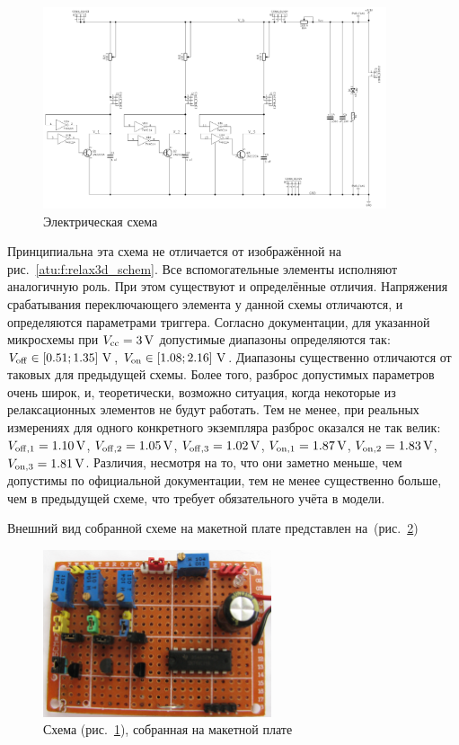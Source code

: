 \begin{figure}[htb!]
  \centerline{\includegraphics[width=0.9\textwidth]{p/relax3ds_schem.png} }
  \caption{Электрическая схема \RelaxShIi}
  \label{atu:f:relax3ds_schem}
\end{figure}

Принципиальна эта схема не отличается от изображённой на рис.~\ref{atu:f:relax3d_schem}.
Все вспомогательные элементы исполняют аналогичную роль.
При этом существуют и определённые отличия.
Напряжения срабатывания переключающего элемента
у данной схемы отличаются, и определяются
параметрами триггера.
Согласно документации, для указанной микросхемы
при $V_\mathrm{cc} = \SI{3}{\volt} $
допустимые диапазоны определяются так:
$V_\mathrm{off} \in [ 0.51; 1.35 ]~ \SI{}{\volt}$,
$V_\mathrm{on}  \in [ 1.08; 2.16 ]~ \SI{}{\volt}$.
Диапазоны существенно отличаются от таковых для предыдущей схемы.
Более того, разброс допустимых параметров очень широк,
и, теоретически, возможно ситуация, когда некоторые из релаксационных
элементов не будут работать.
Тем не менее, при реальных измерениях
для одного конкретного экземпляра
разброс оказался не так велик:
$V_\mathrm{off,1} = \SI{1.10}{\volt}$,
$V_\mathrm{off,2} = \SI{1.05}{\volt}$,
$V_\mathrm{off,3} = \SI{1.02}{\volt}$,
$V_\mathrm{on,1}  = \SI{1.87}{\volt}$,
$V_\mathrm{on,2}  = \SI{1.83}{\volt}$,
$V_\mathrm{on,3}  = \SI{1.81}{\volt}$.
Различия, несмотря на то, что они заметно меньше, чем допустимы по официальной документации,
тем не менее существенно больше, чем в предыдущей схеме, что требует
обязательного учёта в модели.

Внешний вид собранной схеме на макетной плате представлен на~(рис.~\ref{atu:f:relax3ds_board})

\begin{figure}[htb!]
  \centerline{\includegraphics[width=0.6\textwidth]{p/relax3ds_board.jpg} }
  \caption{Схема (рис.~\ref{atu:f:relax3ds_schem}), собранная на макетной плате}
  \label{atu:f:relax3ds_board}
\end{figure}

